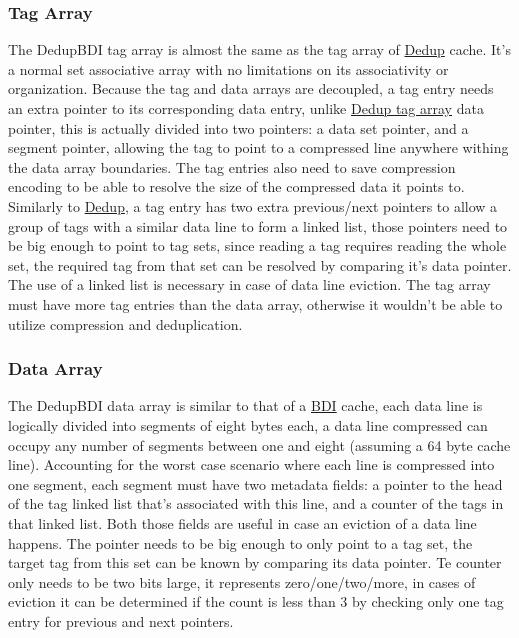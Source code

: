\subsubsection{Tag Array}
\label{sssec:DedupBDITag}
The DedupBDI tag array is almost the same as the tag array of \hyperref[sssec:DedupTag]{Dedup} cache. It's a normal set associative array with no limitations on its associativity or organization. Because the tag and data arrays are decoupled, a tag entry needs an extra pointer to its corresponding data entry, unlike \hyperref[sssec:DedupTag]{Dedup tag array} data pointer, this is actually divided into two pointers: a data set pointer, and a segment pointer, allowing the tag to point to a compressed line anywhere withing the data array boundaries. The tag entries also need to save compression encoding to be able to resolve the size of the compressed data it points to. Similarly to \hyperref[sssec:DedupTag]{Dedup}, a tag entry has two extra previous/next pointers to allow a group of tags with a similar data line to form a linked list, those pointers need to be big enough to point to tag sets, since reading a tag requires reading the whole set, the required tag from that set can be resolved by comparing it's data pointer. The use of a linked list is necessary in case of data line eviction. The tag array must have more tag entries than the data array, otherwise it wouldn't be able to utilize compression and deduplication.
\subsubsection{Data Array}
\label{sssec:DedupBDIData}
The DedupBDI data array is similar to that of a \hyperref[sssec:BDIData]{BDI} cache, each data line is logically divided into segments of eight bytes each, a data line compressed can occupy any number of segments between one and eight (assuming a 64 byte cache line). Accounting for the worst case scenario where each line is compressed into one segment, each segment must have two metadata fields: a pointer to the head of the tag linked list that's associated with this line, and a counter of the tags in that linked list. Both those fields are useful in case an eviction of a data line happens. The pointer needs to be big enough to only point to a tag set, the target tag from this set can be known by comparing its data pointer. Te counter only needs to be two bits large, it represents zero/one/two/more, in cases of eviction it can be determined if the count is less than 3 by checking only one tag entry for previous and next pointers.
